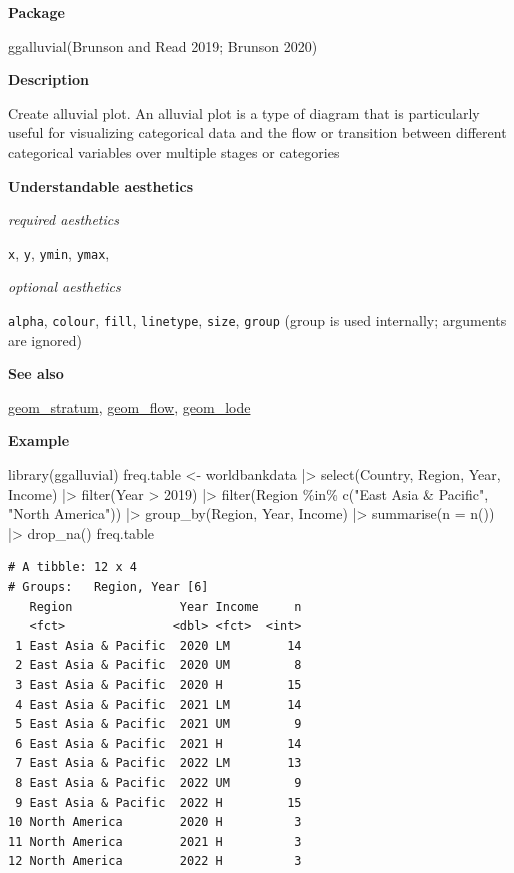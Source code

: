 \documentclass[
  letterpaper,
  DIV=11,
  numbers=noendperiod]{scrreprt}
\newenvironment{Shaded}{\begin{snugshade}}{\end{snugshade}}
\newcommand{\AttributeTok}[1]{\textcolor[rgb]{0.40,0.45,0.13}{#1}}
\newcommand{\DecValTok}[1]{\textcolor[rgb]{0.68,0.00,0.00}{#1}}
\newcommand{\FunctionTok}[1]{\textcolor[rgb]{0.28,0.35,0.67}{#1}}
\newcommand{\NormalTok}[1]{\textcolor[rgb]{0.00,0.23,0.31}{#1}}
\newcommand{\OtherTok}[1]{\textcolor[rgb]{0.00,0.23,0.31}{#1}}
\newcommand{\SpecialCharTok}[1]{\textcolor[rgb]{0.37,0.37,0.37}{#1}}
\newcommand{\StringTok}[1]{\textcolor[rgb]{0.13,0.47,0.30}{#1}}
\begin{document}
\textbf{Package}

ggalluvial(Brunson and Read 2019; Brunson 2020)

\textbf{Description}

Create alluvial plot. An alluvial plot is a type of diagram that is
particularly useful for visualizing categorical data and the flow or
transition between different categorical variables over multiple stages
or categories

\textbf{Understandable aesthetics}

\emph{required aesthetics}

\texttt{x}, \texttt{y}, \texttt{ymin}, \texttt{ymax},

\emph{optional aesthetics}

\texttt{alpha}, \texttt{colour}, \texttt{fill}, \texttt{linetype},
\texttt{size}, \texttt{group} (group is used internally; arguments are
ignored)

\textbf{See also}

\hyperref[stratum]{geom\_stratum}, \hyperref[flow]{geom\_flow},
\hyperref[lode]{geom\_lode}

\textbf{Example}

\begin{Shaded}
\begin{Highlighting}[]
\FunctionTok{library}\NormalTok{(ggalluvial)}
\NormalTok{freq.table }\OtherTok{\textless{}{-}}\NormalTok{ worldbankdata }\SpecialCharTok{|\textgreater{}}
  \FunctionTok{select}\NormalTok{(Country, Region, Year, Income) }\SpecialCharTok{|\textgreater{}}
  \FunctionTok{filter}\NormalTok{(Year }\SpecialCharTok{\textgreater{}} \DecValTok{2019}\NormalTok{) }\SpecialCharTok{|\textgreater{}}
  \FunctionTok{filter}\NormalTok{(Region }\SpecialCharTok{\%in\%} \FunctionTok{c}\NormalTok{(}\StringTok{"East Asia \& Pacific"}\NormalTok{, }\StringTok{"North America"}\NormalTok{)) }\SpecialCharTok{|\textgreater{}}
  \FunctionTok{group\_by}\NormalTok{(Region, Year, Income) }\SpecialCharTok{|\textgreater{}}
  \FunctionTok{summarise}\NormalTok{(}\AttributeTok{n =} \FunctionTok{n}\NormalTok{()) }\SpecialCharTok{|\textgreater{}}
  \FunctionTok{drop\_na}\NormalTok{()}
\NormalTok{freq.table}
\end{Highlighting}
\end{Shaded}

\begin{verbatim}
# A tibble: 12 x 4
# Groups:   Region, Year [6]
   Region               Year Income     n
   <fct>               <dbl> <fct>  <int>
 1 East Asia & Pacific  2020 LM        14
 2 East Asia & Pacific  2020 UM         8
 3 East Asia & Pacific  2020 H         15
 4 East Asia & Pacific  2021 LM        14
 5 East Asia & Pacific  2021 UM         9
 6 East Asia & Pacific  2021 H         14
 7 East Asia & Pacific  2022 LM        13
 8 East Asia & Pacific  2022 UM         9
 9 East Asia & Pacific  2022 H         15
10 North America        2020 H          3
11 North America        2021 H          3
12 North America        2022 H          3
\end{verbatim}
\end{document}
